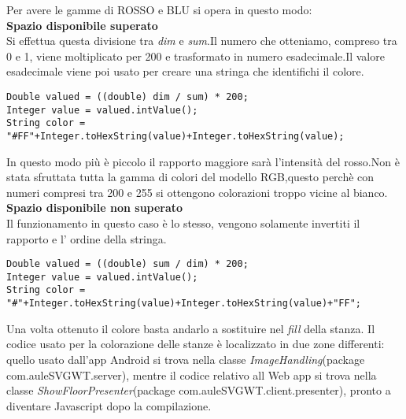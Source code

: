 Per avere le gamme di ROSSO e BLU si opera in questo modo:
\\\textbf{Spazio disponibile superato}\\Si effettua questa divisione tra \textit{dim} e \textit{sum}.Il numero che otteniamo, compreso tra 0 e 1, viene moltiplicato per 200 e trasformato in numero esadecimale.Il valore esadecimale viene poi usato per creare una stringa che identifichi il colore.
\begin{lstlisting}
Double valued = ((double) dim / sum) * 200;
Integer value = valued.intValue();
String color = "#FF"+Integer.toHexString(value)+Integer.toHexString(value);
\end{lstlisting}
In questo modo pi\`u \`e piccolo il rapporto maggiore sar\`a l'intensit\`a del rosso.Non \`e stata sfruttata tutta la gamma di colori del modello RGB,questo perch\`e con numeri compresi tra 200 e 255 si ottengono colorazioni troppo vicine al bianco.
\\\textbf{Spazio disponibile non superato}\\Il funzionamento in questo caso \`e lo stesso, vengono solamente invertiti il rapporto e l' ordine della stringa.
\begin{lstlisting}
Double valued = ((double) sum / dim) * 200;
Integer value = valued.intValue();
String color = "#"+Integer.toHexString(value)+Integer.toHexString(value)+"FF";
\end{lstlisting}
Una volta ottenuto il colore basta andarlo a sostituire nel \textit{fill} della stanza.
Il codice usato per la colorazione delle stanze \`e localizzato in due zone differenti: quello usato dall'app Android si trova nella classe \textit{ImageHandling}(package com.auleSVGWT.server), mentre il codice relativo all Web app si trova nella classe \textit{ShowFloorPresenter}(package com.auleSVGWT.client.presenter), pronto a diventare Javascript dopo la compilazione.


